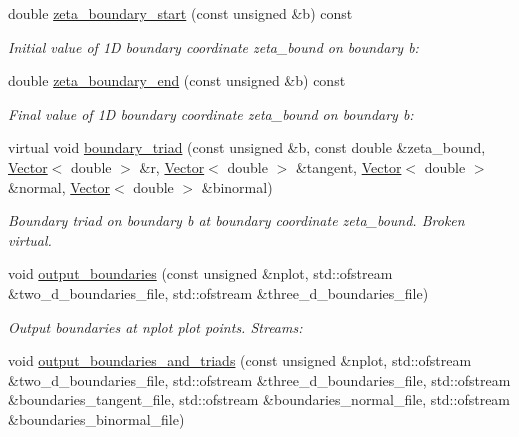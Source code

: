 \begin{DoxyCompactItemize}
double \hyperlink{classoomph_1_1DiskLikeGeomObjectWithBoundaries_aea863d508553cc984ba04a8a3b0fed0e}{zeta\+\_\+boundary\+\_\+start} (const unsigned \&b) const
\begin{DoxyCompactList}\small\item\em Initial value of 1D boundary coordinate zeta\+\_\+bound on boundary b\+: \end{DoxyCompactList}\item 
double \hyperlink{classoomph_1_1DiskLikeGeomObjectWithBoundaries_aace3c0d4f66e771bf006d3ff78ae82e5}{zeta\+\_\+boundary\+\_\+end} (const unsigned \&b) const
\begin{DoxyCompactList}\small\item\em Final value of 1D boundary coordinate zeta\+\_\+bound on boundary b\+: \end{DoxyCompactList}\item 
virtual void \hyperlink{classoomph_1_1DiskLikeGeomObjectWithBoundaries_aafe14f8fb055a10b33da4e730f457308}{boundary\+\_\+triad} (const unsigned \&b, const double \&zeta\+\_\+bound, \hyperlink{classoomph_1_1Vector}{Vector}$<$ double $>$ \&r, \hyperlink{classoomph_1_1Vector}{Vector}$<$ double $>$ \&tangent, \hyperlink{classoomph_1_1Vector}{Vector}$<$ double $>$ \&normal, \hyperlink{classoomph_1_1Vector}{Vector}$<$ double $>$ \&binormal)
\begin{DoxyCompactList}\small\item\em Boundary triad on boundary b at boundary coordinate zeta\+\_\+bound. Broken virtual. \end{DoxyCompactList}\item 
void \hyperlink{classoomph_1_1DiskLikeGeomObjectWithBoundaries_ad083be3c9cf9b9b493bc3e38ad809fc8}{output\+\_\+boundaries} (const unsigned \&nplot, std\+::ofstream \&two\+\_\+d\+\_\+boundaries\+\_\+file, std\+::ofstream \&three\+\_\+d\+\_\+boundaries\+\_\+file)
\begin{DoxyCompactList}\small\item\em Output boundaries at nplot plot points. Streams\+: \end{DoxyCompactList}\item 
void \hyperlink{classoomph_1_1DiskLikeGeomObjectWithBoundaries_a5817503e1416b8ec99de7c25dff0213c}{output\+\_\+boundaries\+\_\+and\+\_\+triads} (const unsigned \&nplot, std\+::ofstream \&two\+\_\+d\+\_\+boundaries\+\_\+file, std\+::ofstream \&three\+\_\+d\+\_\+boundaries\+\_\+file, std\+::ofstream \&boundaries\+\_\+tangent\+\_\+file, std\+::ofstream \&boundaries\+\_\+normal\+\_\+file, std\+::ofstream \&boundaries\+\_\+binormal\+\_\+file)

\end{DoxyCompactItemize}
